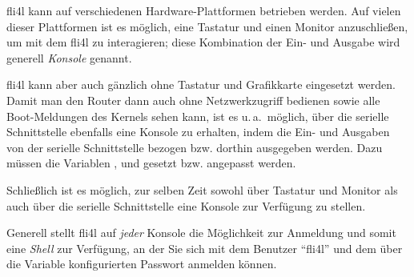 
fli4l kann auf verschiedenen Hardware-Plattformen betrieben werden.
Auf vielen dieser Plattformen ist es möglich, eine Tastatur und einen Monitor
anzuschließen, um mit dem fli4l zu interagieren; diese Kombination der Ein-
und Ausgabe wird generell \emph{Konsole} genannt.

fli4l kann aber auch gänzlich ohne Tastatur und Grafikkarte eingesetzt
werden. Damit man den Router dann auch ohne Netzwerkzugriff bedienen
sowie alle Boot-Meldungen des Kernels sehen kann, ist es u.\,a.\ möglich, über
die serielle Schnittstelle ebenfalls eine Konsole zu erhalten, indem die
Ein- und Ausgaben von der serielle Schnittstelle bezogen bzw. dorthin
ausgegeben werden. Dazu müssen die Variablen
,
 und
 gesetzt bzw. angepasst werden.

Schließlich ist es möglich, zur selben Zeit sowohl über Tastatur und
Monitor als auch über die serielle Schnittstelle eine Konsole zur Verfügung
zu stellen.

Generell stellt fli4l auf \emph{jeder} Konsole die Möglichkeit zur
Anmeldung und somit eine \emph{Shell} zur Verfügung, an der Sie sich mit dem
Benutzer ``fli4l'' und dem über die Variable 
konfigurierten Passwort anmelden können.

